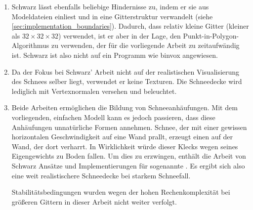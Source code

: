 \begin{enumerate}
\item Schwarz lässt ebenfalls beliebige Hindernisse zu, indem er sie
aus Modeldateien einliest und in eine Gitterstruktur verwandelt (siehe
\cref{sec:implementation_boundaries}). Dadurch, dass relativ
kleine Gitter (kleiner als $32 \times 32 \times 32$) verwendet, ist er
aber in der Lage, den Punkt-in-Polygon-Algorithmus zu verwenden, der
für die vorliegende Arbeit zu zeitaufwändig ist. Schwarz ist also
nicht auf ein Programm wie binvox angewiesen.
\item Da der Fokus bei Schwarz' Arbeit nicht auf der realistischen
Visualisierung des Schnees selber liegt, verwendet er keine
Texturen. Die Schneedecke wird lediglich mit Vertexnormalen versehen
und beleuchtet.
\item Beide Arbeiten ermöglichen die Bildung von
Schneeanhäufungen. Mit dem vorliegenden, einfachen Modell kann es
jedoch passieren, dass diese Anhäufungen unnatürliche Formen
annehmen. Schnee, der mit einer gewissen horizontalen Geschwindigkeit
auf eine Wand prallt, erzeugt einen  auf der
Wand, der dort verharrt. In Wirklichkeit würde dieser Klecks wegen
seines Eigengewichts zu Boden fallen. Um dies zu erzwingen, enthält
die Arbeit von Schwarz Ansätze und Implementierungen für sogenannte
. Es ergibt sich also eine weit
realistischere Schneedecke bei starkem Schneefall.

Stabilitätsbedingungen wurden wegen der hohen Rechenkomplexität bei
größeren Gittern in dieser Arbeit nicht weiter verfolgt.
\end{enumerate}

